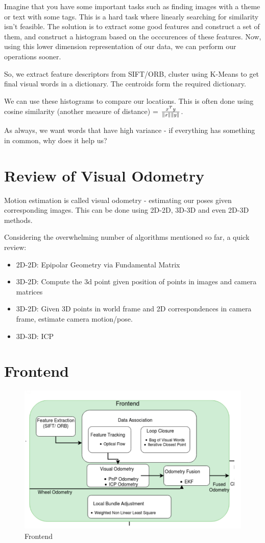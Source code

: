 Imagine that you have some important tasks such as finding images with a theme or text with some tags. This is a hard task where linearly searching for similarity isn't feasible. The solution is to extract some good features and construct a set of them, and construct a histogram based on the occcurences of these features. Now, using this lower dimension representation of our data, we can perform our operations sooner.

So, we extract feature descriptors from SIFT/ORB, cluster using K-Means to get final visual words in a dictionary. The centroids form the required dictionary.

We can use these histograms to compare our locations. This is often done using cosine similarity (another measure of distance) = $\frac{x^Ty}{\left\lVert x\right\rVert\left\lVert y\right\rVert}$.

As always, we want words that have high variance - if everything has something in common, why does it help us? 

\section{Review of Visual Odometry}

Motion estimation is called visual odometry - estimating our poses given corresponding images. This can be done using 2D-2D, 3D-3D and even 2D-3D methods.

Considering the overwhelming number of algorithms mentioned so far, a quick review:

\begin{itemize}
    \item 2D-2D: Epipolar Geometry via Fundamental Matrix
    \item 3D-2D: Compute the 3d point given position of points in images and camera matrices
    \item 3D-2D: Given 3D points in world frame and 2D correspondences in camera frame, estimate camera motion/pose.
    \item 3D-3D: ICP
\end{itemize}

\section{Frontend}

\begin{figure}[h]
    \centering
    \includegraphics[width=12cm]{img/frontend.png}
    \caption{Frontend}
    \label{fig:frontend}
\end{figure}

